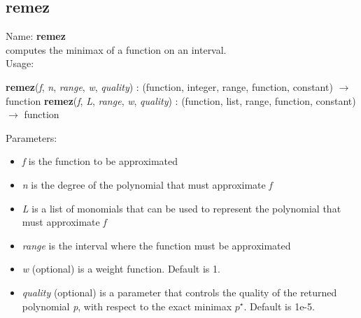 \subsection{remez}
\label{labremez}
\noindent Name: \textbf{remez}\\
computes the minimax of a function on an interval.\\
\noindent Usage: 
\begin{center}
\textbf{remez}(\emph{f}, \emph{n}, \emph{range}, \emph{w}, \emph{quality}) : (\textsf{function}, \textsf{integer}, \textsf{range}, \textsf{function}, \textsf{constant}) $\rightarrow$ \textsf{function}
\textbf{remez}(\emph{f}, \emph{L}, \emph{range}, \emph{w}, \emph{quality}) : (\textsf{function}, \textsf{list}, \textsf{range}, \textsf{function}, \textsf{constant}) $\rightarrow$ \textsf{function}
\end{center}
Parameters: 
\begin{itemize}
\item \emph{f} is the function to be approximated
\item \emph{n} is the degree of the polynomial that must approximate \emph{f}
\item \emph{L} is a list of monomials that can be used to represent the polynomial that must approximate \emph{f}
\item \emph{range} is the interval where the function must be approximated
\item \emph{w} (optional) is a weight function. Default is 1.
\item \emph{quality} (optional) is a parameter that controls the quality of the returned polynomial \emph{p}, with respect to the exact minimax $p^\star$. Default is 1e-5.
\end{itemize}

